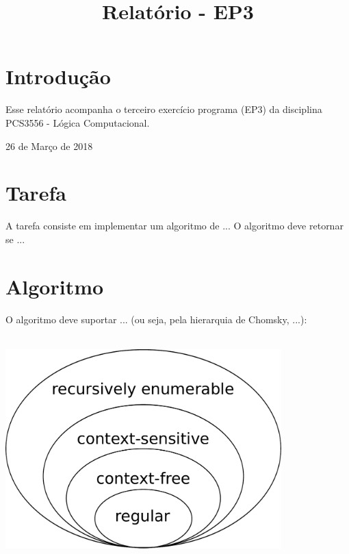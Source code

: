 \documentclass[conference]{IEEEtran}
\begin{document}
\title{Relatório - EP3}

\author{
}

\maketitle

\section{Introdução}
Esse relatório acompanha o terceiro exercício programa (EP3) da disciplina PCS3556 - Lógica Computacional.

\hfill 26 de Março de 2018

\section{Tarefa}

A tarefa consiste em implementar um algoritmo de ... O algoritmo deve retornar se ...

\section{Algoritmo}

O algoritmo deve suportar ... (ou seja, pela hierarquia de Chomsky, ...):
\\
\\
\begin{minipage}{\linewidth}
    \centering
    \label{chomsky}
    \includegraphics[width=0.8\textwidth]{Chomsky-hierarchy.pdf}
\end{minipage}
\end{document}
